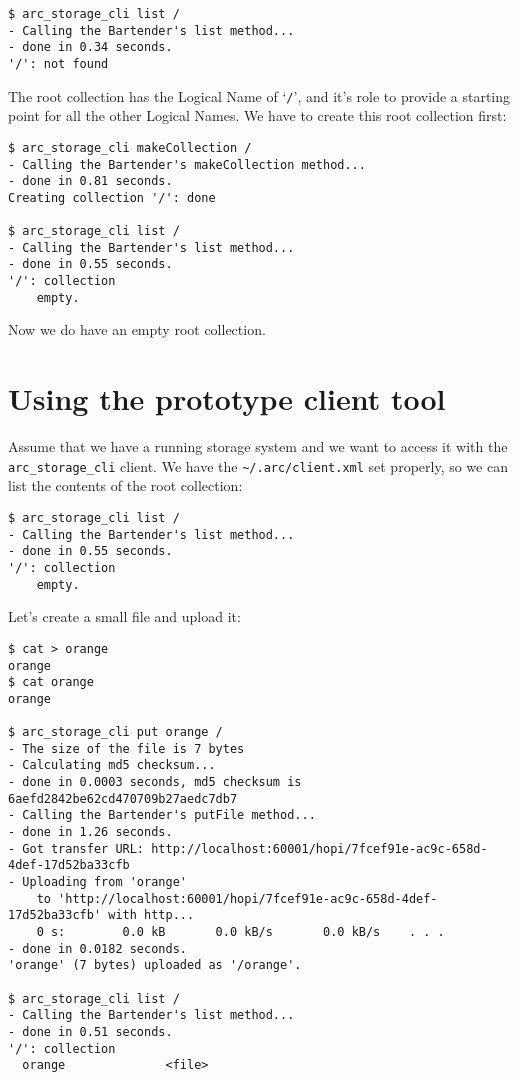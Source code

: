 \documentclass{book}
\begin{document}
\begin{verbatim}
$ arc_storage_cli list /
- Calling the Bartender's list method...
- done in 0.34 seconds.
'/': not found
\end{verbatim}

The root collection has the Logical Name of `\verb!/!', and it's role to provide a starting point for all the other Logical Names. We have to create this root collection first:

\begin{verbatim}
$ arc_storage_cli makeCollection /
- Calling the Bartender's makeCollection method...
- done in 0.81 seconds.
Creating collection '/': done

$ arc_storage_cli list /
- Calling the Bartender's list method...
- done in 0.55 seconds.
'/': collection
    empty.
\end{verbatim}

Now we do have an empty root collection.

\section{Using the prototype client tool} %

Assume that we have a running storage system and we want to access it with the \verb!arc_storage_cli! client. We have the \verb!~/.arc/client.xml! set properly, so we can list the contents of the root collection:

\begin{verbatim}
$ arc_storage_cli list /
- Calling the Bartender's list method...
- done in 0.55 seconds.
'/': collection
    empty.
\end{verbatim}

Let's create a small file and upload it:

\begin{verbatim}
$ cat > orange
orange
$ cat orange 
orange

$ arc_storage_cli put orange /
- The size of the file is 7 bytes
- Calculating md5 checksum...
- done in 0.0003 seconds, md5 checksum is 6aefd2842be62cd470709b27aedc7db7
- Calling the Bartender's putFile method...
- done in 1.26 seconds.
- Got transfer URL: http://localhost:60001/hopi/7fcef91e-ac9c-658d-4def-17d52ba33cfb
- Uploading from 'orange'
    to 'http://localhost:60001/hopi/7fcef91e-ac9c-658d-4def-17d52ba33cfb' with http...
    0 s:        0.0 kB       0.0 kB/s       0.0 kB/s    . . .       
- done in 0.0182 seconds.
'orange' (7 bytes) uploaded as '/orange'.

$ arc_storage_cli list /
- Calling the Bartender's list method...
- done in 0.51 seconds.
'/': collection
  orange              <file>

\end{verbatim}
\end{document}
